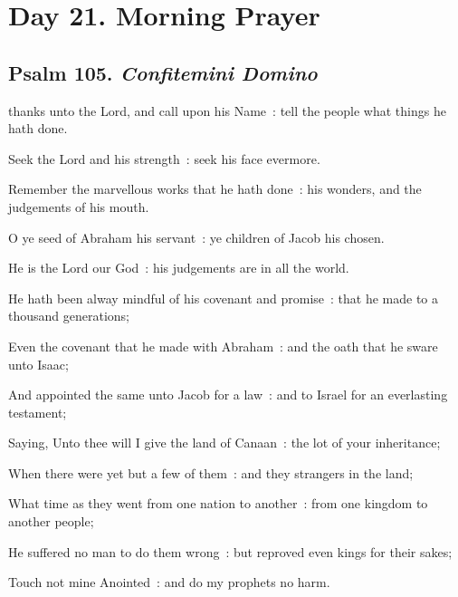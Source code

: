 \clearpage
\section*{Day 21. Morning Prayer}

\subsection{Psalm 105. \textit{Confitemini Domino}}


 thanks unto the Lord, and call upon his Name~: tell the people what things he hath done.\par
{}
Seek the Lord and his strength~: seek his face evermore.\par
{}Remember the marvellous works that he hath done~: his wonders, and the judgements of his mouth.\par
{}O ye seed of Abraham his servant~: ye children of Jacob his chosen.\par
{}He is the Lord our God~: his judgements are in all the world.\par
{}He hath been alway mindful of his covenant and promise~: that he made to a thousand generations;\par
{}Even the covenant that he made with Abraham~: and the oath that he sware unto Isaac;\par
{}And appointed the same unto Jacob for a law~: and to Israel for an everlasting testament;\par
{}Saying, Unto thee will I give the land of Canaan~: the lot of your inheritance;\par
{}When there were yet but a few of them~: and they strangers in the land;\par
{}What time as they went from one nation to another~: from one kingdom to another people;\par
{}He suffered no man to do them wrong~: but reproved even kings for their sakes;\par
{}Touch not mine Anointed~: and do my prophets no harm.\par
